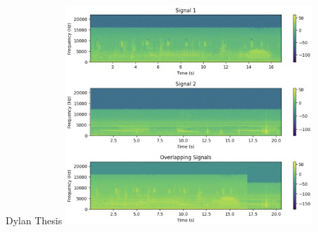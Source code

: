 \begin{frame}{Dylan Thesis}
    \centering
    \includegraphics[height=0.7\textheight,width=0.7\textwidth,keepaspectratio]{dylan-aid-1-24.png}
\end{frame}









